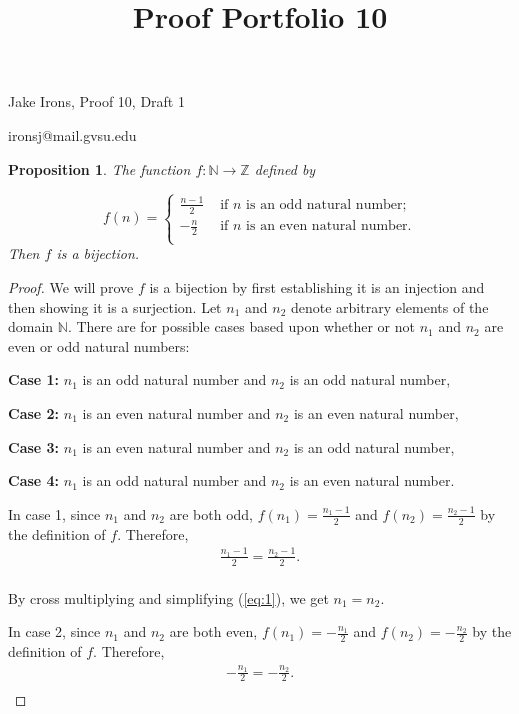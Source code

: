\documentclass[11 pt]{article}
\title{Proof Portfolio 10}
\newtheorem{proposition}{Proposition}
\newcommand{\newpar}{\vspace{.15in}\noindent}
\begin{document}
\noindent Jake Irons, Proof 10, Draft 1

\noindent ironsj@mail.gvsu.edu

\newpar
\begin{proposition}
The function $f:\mathbb{N} \to \mathbb{Z}$ defined by

$$ f(n) =  
\begin{cases}      

\frac{n-1}{2} & \textrm{ if $n$ is an odd natural number;} \\   

-\frac{n}{2} & \textrm{ if $n$ is an even natural number.} \\   

\end{cases} $$ 
Then $f$ is a bijection.
\end{proposition}
\begin{proof}
\newpar 
We will prove $f$ is a bijection by first establishing it is an injection and then showing it is a surjection. Let $n_1$ and $n_2$ denote arbitrary elements of the domain $\mathbb{N}$. There are for possible cases based upon whether or not $n_1$ and $n_2$ are even or odd natural numbers:

\textbf{Case 1:} $n_1$ is an odd natural number and $n_2$ is an odd natural number,

\textbf{Case 2:} $n_1$ is an even natural number and $n_2$ is an even natural number,

\textbf{Case 3:} $n_1$ is an even natural number and $n_2$ is an odd natural number,

\textbf{Case 4:} $n_1$ is an odd natural number and $n_2$ is an even natural number.

\newpar
In case 1, since $n_1$ and $n_2$ are both odd, $f(n_1)=\frac{n_1-1}{2}$ and $f(n_2)=\frac{n_2-1}{2}$ by the definition of $f$. Therefore,
\begin{align}
\frac{n_1-1}{2}=\frac{n_2-1}{2}. \label{eq:1} \\
\nonumber \end{align}

\newpar 
By cross multiplying and simplifying (\ref{eq:1}), we get $n_1=n_2$.

\newpar
In case 2, since $n_1$ and $n_2$ are both even, $f(n_1)=-\frac{n_1}{2}$ and $f(n_2)=-\frac{n_2}{2}$ by the definition of $f$. Therefore,
\begin{align}
-\frac{n_1}{2}=-\frac{n_2}{2}. \label{eq:2} \\
\nonumber \end{align}


\end{proof}
\end{document}
